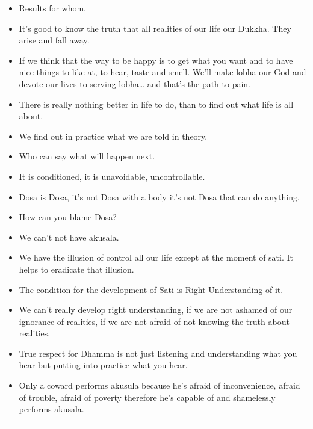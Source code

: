 \documentclass{article}
\begin{document}
\begin{itemize}
\item 
  Results for whom.

\item 
  It's good to know the truth that all realities of our life our
  Dukkha. They arise and fall away.

\item 
  If we think that the way to be happy is to get what you want and to
  have nice things to like at, to hear, taste and smell. We'll make
  lobha our God and devote our lives to serving lobha\ldots{} and
  that's the path to pain.

\item 
  There is really nothing better in life to do, than to find out what
  life is all about.

\item 
  We find out in practice what we are told in theory.

\item 
  Who can say what will happen next.

\item 
  It is conditioned, it is unavoidable, uncontrollable.

\item 
  Dosa is Dosa, it's not Dosa with a body it's not Dosa that can do
  anything.

\item 
  How can you blame Dosa?

\item 
  We can't not have akusala.

\item 
  We have the illusion of control all our life except at the moment
  of sati. It helps to eradicate that illusion.

\item 
  The condition for the development of Sati is Right Understanding of
  it.

\item 
  We can't really develop right understanding, if we are not ashamed
  of our ignorance of realities, if we are not afraid of not knowing
  the truth about realities.

\item 
  True respect for Dhamma is not just listening and understanding
  what you hear but putting into practice what you hear.

\item 
  Only a coward performs akusula because he's afraid of
  inconvenience, afraid of trouble, afraid of poverty therefore he's
  capable of and shamelessly performs akusala.

\end{itemize}
\begin{center}\rule{3in}{0.4pt}\end{center}
\end{document}
